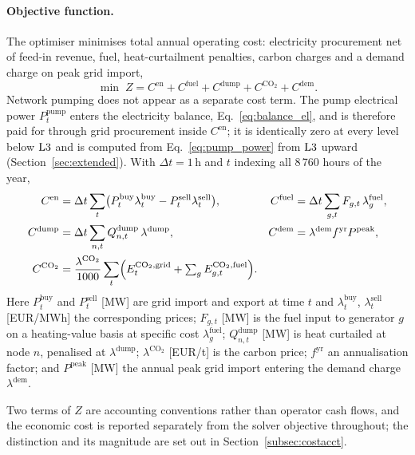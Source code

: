 \paragraph{Objective function.}
The optimiser minimises total annual operating cost: electricity procurement net of
feed-in revenue, fuel, heat-curtailment penalties, carbon charges and a demand charge on
peak grid import,
%
\begin{equation}
  \min \; Z = C^{\mathrm{en}} + C^{\mathrm{fuel}}
    + C^{\mathrm{dump}} + C^{\mathrm{CO_2}} + C^{\mathrm{dem}} .
  \label{eq:objective}
\end{equation}
%
Network pumping does not appear as a separate cost term. The pump electrical power
$P_t^{\mathrm{pump}}$ enters the electricity balance, Eq.~\eqref{eq:balance_el}, and is
therefore paid for through grid procurement inside $C^{\mathrm{en}}$; it is identically
zero at every level below $\mathrm{L3}$ and is computed from Eq.~\eqref{eq:pump_power} from
$\mathrm{L3}$ upward (Section~\ref{sec:extended}). With $\Delta t = 1$\,h and $t$ indexing all
8\,760 hours of the year,
%
\begin{align*}
C^{\mathrm{en}}   &= \Delta t \sum_t
  \bigl(P_t^{\mathrm{buy}} \lambda_t^{\mathrm{buy}}
        - P_t^{\mathrm{sell}} \lambda_t^{\mathrm{sell}}\bigr), &
C^{\mathrm{fuel}} &= \Delta t \sum_{g,t}
  F_{g,t}\, \lambda_g^{\mathrm{fuel}}, \\
C^{\mathrm{dump}} &= \Delta t \sum_{n,t}
  Q_{n,t}^{\mathrm{dump}}\, \lambda^{\mathrm{dump}}, &
C^{\mathrm{dem}}  &= \lambda^{\mathrm{dem}} f^{\mathrm{yr}}
  P^{\mathrm{peak}}, \\
C^{\mathrm{CO_2}} &= \frac{\lambda^{\mathrm{CO_2}}}{1000} \sum_t
  \Bigl(E_t^{\mathrm{CO_2,grid}} +
        \textstyle\sum_g E_{g,t}^{\mathrm{CO_2,fuel}}\Bigr). &&
\end{align*}
%
Here $P_t^{\mathrm{buy}}$ and $P_t^{\mathrm{sell}}$ [MW] are grid import and export at
time $t$ and $\lambda_t^{\mathrm{buy}}$, $\lambda_t^{\mathrm{sell}}$ [EUR/MWh] the
corresponding prices; $F_{g,t}$ [MW] is the fuel input to generator $g$ on a
heating-value basis at specific cost $\lambda_g^{\mathrm{fuel}}$;
$Q_{n,t}^{\mathrm{dump}}$ [MW] is heat curtailed at node $n$, penalised at
$\lambda^{\mathrm{dump}}$; $\lambda^{\mathrm{CO_2}}$ [EUR/t] is the carbon price;
$f^{\mathrm{yr}}$ an annualisation factor; and $P^{\mathrm{peak}}$ [MW] the annual peak
grid import entering the demand charge $\lambda^{\mathrm{dem}}$.

Two terms of $Z$ are accounting conventions rather than operator cash flows, and the
economic cost is reported separately from the solver objective throughout; the
distinction and its magnitude are set out in Section~\ref{subsec:costacct}.

